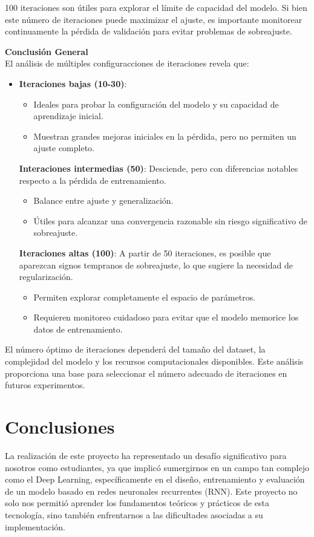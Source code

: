 \documentclass{article}
\begin{document}
100 iteraciones son útiles para explorar el límite de capacidad del modelo. Si bien este número de iteraciones puede maximizar el ajuste, es importante monitorear continuamente la pérdida de validación para evitar problemas de sobreajuste.

\newpage

{\Large{\textbf{Conclusión General}}} \\

El análisis de múltiples configuracciones de iteraciones revela que:
\begin{itemize}
    \item \textbf{Iteraciones bajas (10-30)}:
    \begin{itemize}
        \item Ideales para probar la configuración del modelo y su capacidad de aprendizaje inicial.
        \item Muestran grandes mejoras iniciales en la pérdida, pero no permiten un ajuste completo.
    \end{itemize}
    \textbf{Interaciones intermedias (50)}: Desciende, pero con diferencias notables respecto a la pérdida de entrenamiento.
    \begin{itemize}
        \item Balance entre ajuste y generalización.
        \item Útiles para alcanzar una convergencia razonable sin riesgo significativo de sobreajuste.
    \end{itemize}
    \textbf{Iteraciones altas (100)}: A partir de 50 iteraciones, es posible que aparezcan signos tempranos de sobreajuste, lo que sugiere la necesidad de regularización.
    \begin{itemize}
        \item Permiten explorar completamente el espacio de parámetros.
        \item Requieren monitoreo cuidadoso para evitar que el modelo memorice los datos de entrenamiento.
    \end{itemize}
\end{itemize}

El número óptimo de iteraciones dependerá del tamaño del dataset, la complejidad del modelo y los recursos computacionales disponibles. Este análisis proporciona una base para seleccionar el número adecuado de iteraciones en futuros experimentos.

\newpage

\section{Conclusiones}
La realización de este proyecto ha representado un desafío significativo para nosotros como estudiantes, ya que implicó sumergirnos en un campo tan complejo como el Deep Learning, específicamente en el diseño, entrenamiento y evaluación de un modelo basado en redes neuronales recurrentes (RNN). Este proyecto no solo nos permitió aprender los fundamentos teóricos y prácticos de esta tecnología, sino también enfrentarnos a las dificultades asociadas a su implementación. \\
\end{document}
